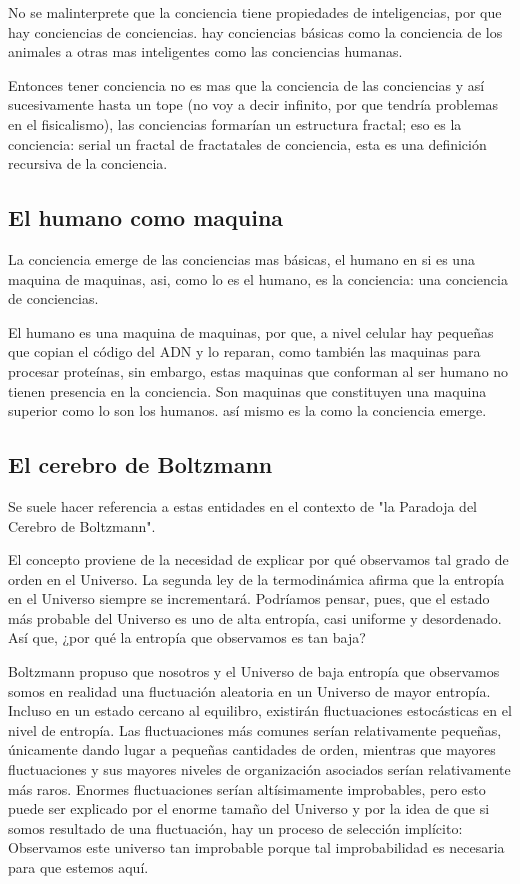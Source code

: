 \documentclass[12pt,letterpaper, a4paper ]{article}
\begin{document}
No se malinterprete que la conciencia tiene propiedades de inteligencias, por que hay conciencias de conciencias. hay conciencias básicas como la conciencia de los animales a otras mas inteligentes como las conciencias humanas.

Entonces tener conciencia no es mas que la conciencia de las conciencias y así sucesivamente hasta un tope (no voy a decir infinito, por que tendría problemas en el fisicalismo), las conciencias formarían un estructura fractal;
eso es la conciencia: serial un fractal de fractatales de conciencia, esta es una definición recursiva de la conciencia.

\subsection{El humano como maquina}

La conciencia emerge de las conciencias mas básicas, el humano en si es una maquina de maquinas, asi, como lo es el humano, es la conciencia: una conciencia de conciencias.

El humano es una maquina de maquinas, por que, a nivel celular hay pequeñas que copian el código del ADN y lo reparan, como también las maquinas para procesar proteínas, sin embargo, estas maquinas que conforman al ser humano no tienen presencia en la conciencia. Son maquinas que constituyen una maquina superior como lo son los humanos. así mismo es la como la conciencia emerge.

\subsection{El cerebro de Boltzmann}

Se suele hacer referencia a estas entidades en el contexto de "la Paradoja del Cerebro de Boltzmann".

El concepto proviene de la necesidad de explicar por qué observamos tal grado de orden en el Universo. La segunda ley de la termodinámica afirma que la entropía en el Universo siempre se incrementará. Podríamos pensar, pues, que el estado más probable del Universo es uno de alta entropía, casi uniforme y desordenado. Así que, ¿por qué la entropía que observamos es tan baja?

Boltzmann propuso que nosotros y el Universo de baja entropía que observamos somos en realidad una fluctuación aleatoria en un Universo de mayor entropía. Incluso en un estado cercano al equilibro, existirán fluctuaciones estocásticas en el nivel de entropía. Las fluctuaciones más comunes serían relativamente pequeñas, únicamente dando lugar a pequeñas cantidades de orden, mientras que mayores fluctuaciones y sus mayores niveles de organización asociados serían relativamente más raros. Enormes fluctuaciones serían altísimamente improbables, pero esto puede ser explicado por el enorme tamaño del Universo y por la idea de que si somos resultado de una fluctuación, hay un proceso de selección implícito: Observamos este universo tan improbable porque tal improbabilidad es necesaria para que estemos aquí.
\end{document}
